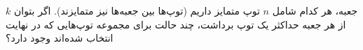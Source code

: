 \p
$k$
جعبه، هر کدام شامل
$n$
توپ متمایز داریم
(توپ‌ها بین جعبه‌ها نیز متمایزند).
اگر بتوان از هر جعبه حداکثر یک توپ برداشت، چند حالت برای مجموعه توپ‌هایی
که در نهایت انتخاب شده‌اند وجود دارد؟